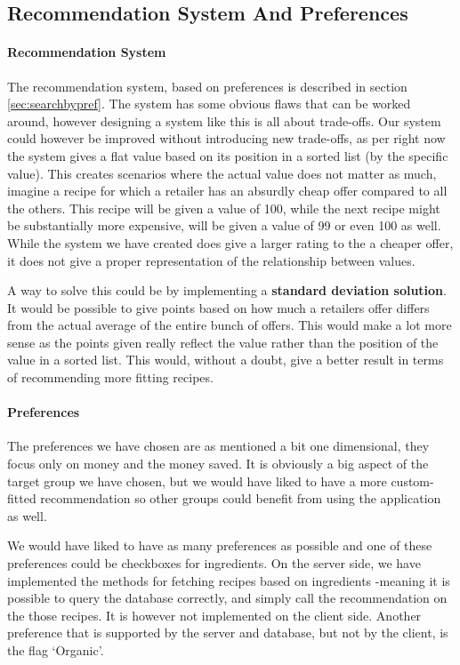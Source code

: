 \subsection{Recommendation System And Preferences}
\label{subsec:recommend}

\paragraph{Recommendation System}
The recommendation system, based on preferences is described in section \ref{sec:searchbypref}. The system has some obvious flaws that can be worked around, however designing a system like this is all about trade-offs. Our system could however be improved without introducing new trade-offs, as per right now the system gives a flat value based on its position in a sorted list (by the specific value). This creates scenarios where the actual value does not matter as much, imagine a recipe for which a retailer has an absurdly cheap offer compared to all the others. This recipe will be given a value of 100, while the next recipe might be substantially more expensive, will be given a value of 99 or even 100 as well. While the system we have created does give a larger rating to the a cheaper offer, it does not give a proper representation of the relationship between values.

A way to solve this could be by implementing a \textbf{standard deviation solution}. It would be possible to give points based on how much a retailers offer differs from the actual average of the entire bunch of offers. This would make a lot more sense as the points given really reflect the value rather than the position of the value in a sorted list. This would, without a doubt, give a better result in terms of recommending more fitting recipes.

\paragraph{Preferences}
The preferences we have chosen are as mentioned a bit one dimensional, they focus only on money and the money saved. It is obviously a big aspect of the target group we have chosen, but we would have liked to have a more custom-fitted recommendation so other groups could benefit from using the application as well.

We would have liked to have as many preferences as possible and one of these preferences could be checkboxes for ingredients. On the server side, we have implemented the methods for fetching recipes based on ingredients -meaning it is possible to query the database correctly, and simply call the recommendation on the those recipes. It is however not implemented on the client side. Another preference that is supported by the server and database, but not by the client, is the flag `Organic'. 

